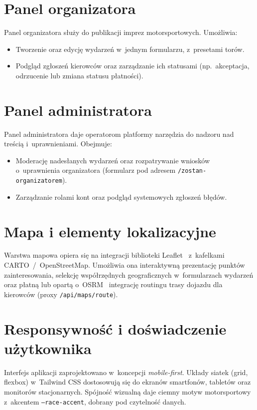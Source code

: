 \documentclass{sprz}
\begin{document}
\section{Panel organizatora}
Panel organizatora służy do publikacji imprez motorsportowych. Umożliwia:
\begin{itemize}
  \item Tworzenie oraz edycję wydarzeń w~jednym formularzu, z~presetami torów.
  \item Podgląd zgłoszeń kierowców oraz zarządzanie ich statusami (np.\ akceptacja, odrzucenie lub zmiana statusu płatności).
\end{itemize}

\section{Panel administratora}
Panel administratora daje operatorom platformy narzędzia do nadzoru nad treścią i~uprawnieniami. Obejmuje:
\begin{itemize}
  \item Moderację nadesłanych wydarzeń oraz rozpatrywanie wniosków o~uprawnienia organizatora (formularz pod adresem \texttt{/zostan-organizatorem}).
  \item Zarządzanie rolami kont oraz podgląd systemowych zgłoszeń błędów.
\end{itemize}

\section{Mapa i elementy lokalizacyjne}
Warstwa mapowa opiera się na integracji biblioteki Leaflet~\cite{leaflet:docs} z~kafelkami CARTO~/~OpenStreetMap. Umożliwia ona interaktywną prezentację punktów zainteresowania, selekcję współrzędnych geograficznych w~formularzach wydarzeń oraz płatną lub opartą o~OSRM~\cite{osrm:project} integrację routingu trasy dojazdu dla kierowców (proxy \texttt{/api/maps/route}).

\section{Responsywność i doświadczenie użytkownika}
Interfejs aplikacji zaprojektowano w~koncepcji \emph{mobile-first}. Układy siatek (grid, flexbox) w~Tailwind CSS dostosowują się do ekranów smartfonów, tabletów oraz monitorów stacjonarnych. Spójność wizualną daje ciemny motyw motorsportowy z~akcentem \texttt{--race-accent}, dobrany pod czytelność danych.
\end{document}
